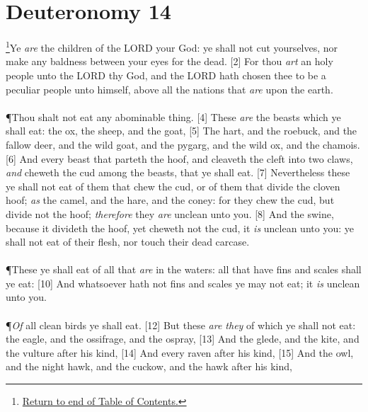 \chapter{Deuteronomy 14}
\footnote{\textcolor[rgb]{0.00,0.25,0.00}{\hyperlink{DeuteronomyTOC}{Return to end of Table of Contents.}}}\textcolor[rgb]{0.00,0.00,1.00}{Ye \emph{are} the children of the LORD your God: ye shall not cut yourselves, nor make any baldness between your eyes for the dead.}
[2] \textcolor[rgb]{0.00,0.00,1.00}{For thou \emph{art} an holy people unto the LORD thy God, and the LORD hath chosen thee to be a peculiar people unto himself, above all the nations that \emph{are} upon the earth.}\\
\\
\P \textcolor[rgb]{0.00,0.00,1.00}{Thou shalt not eat any abominable thing.}
[4] \textcolor[rgb]{0.00,0.00,1.00}{These \emph{are} the beasts which ye shall eat: the ox, the sheep, and the goat,}
[5] \textcolor[rgb]{0.00,0.00,1.00}{The hart, and the roebuck, and the fallow deer, and the wild goat, and the pygarg, and the wild ox, and the chamois.}
[6] \textcolor[rgb]{0.00,0.00,1.00}{And every beast that parteth the hoof, and cleaveth the cleft into two claws, \emph{and} cheweth the cud among the beasts, that ye shall eat.}
[7] \textcolor[rgb]{0.00,0.00,1.00}{Nevertheless these ye shall not eat of them that chew the cud, or of them that divide the cloven hoof; \emph{as} the camel, and the hare, and the coney: for they chew the cud, but divide not the hoof; \emph{therefore} they \emph{are} unclean unto you.}
[8] \textcolor[rgb]{0.00,0.00,1.00}{And the swine, because it divideth the hoof, yet cheweth not the cud, it \emph{is} unclean unto you: ye shall not eat of their flesh, nor touch their dead carcase.}\\
\\
\P \textcolor[rgb]{0.00,0.00,1.00}{These ye shall eat of all that \emph{are} in the waters: all that have fins and scales shall ye eat:}
[10] \textcolor[rgb]{0.00,0.00,1.00}{And whatsoever hath not fins and scales ye may not eat; it \emph{is} unclean unto you.}\\
\\
\P \textcolor[rgb]{0.00,0.00,1.00}{\emph{Of} all clean birds ye shall eat.}
[12] \textcolor[rgb]{0.00,0.00,1.00}{But these \emph{are they} of which ye shall not eat: the eagle, and the ossifrage, and the ospray,}
[13] \textcolor[rgb]{0.00,0.00,1.00}{And the glede, and the kite, and the vulture after his kind,}
[14] \textcolor[rgb]{0.00,0.00,1.00}{And every raven after his kind,}
[15] \textcolor[rgb]{0.00,0.00,1.00}{And the owl, and the night hawk, and the cuckow, and the hawk after his kind,}
